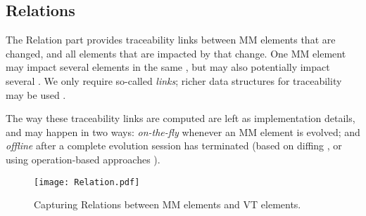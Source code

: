 \subsection{Relations}
\label{sec:Suggestion:Relation}

The \textsf{Relation} part provides traceability links between \textsf{MM}
elements that are \textsf{changed}, and all \viewtype elements that are 
\textsf{impacted} by that change. One \textsf{MM} element
may impact several elements in the same \viewtype, but may also potentially
impact several \viewtypes. We only require so-called \emph{links}; richer
data structures for traceability may be used \autocite{Batot-Cabot-Gerard:2021}.

The way these traceability links are computed are left as implementation
details, and may happen in two ways: \emph{on-the-fly} whenever an \textsf{MM} element is evolved; and \emph{offline}
after a complete evolution session has terminated (based on diffing \autocite{Kehrer-Kelter-Taentzer:2011}, or using 
operation-based approaches \parencite{J:Lippe-Oosterom:1992}).

\begin{figure}[t]
    \centering
    \texttt{[image: Relation.pdf]}
    \caption{Capturing \textsf{Relation}s between \textsf{MM} elements and \textsf{VT} elements.}
    \label{fig:Relation}
\end{figure}

